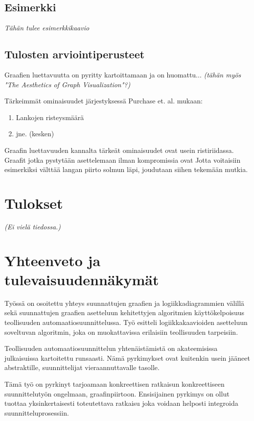 \documentclass[finnish,12pt]{article}
\begin{document}
		\subsection{Esimerkki}
			\emph{Tähän tulee esimerkkikaavio}


		\subsection{Tulosten arviointiperusteet}



Graafien luettavuutta on pyritty kartoittamaan ja on huomattu... \cite{RefWorks:47}
\emph{(tähän myös "The Aesthetics of Graph Visualization"?)}

Tärkeimmät ominaisuudet järjestyksessä Purchase et. al. mukaan: 
\begin{enumerate}
  \item Lankojen risteysmäärä
  \item jne. (kesken)
\end{enumerate}

Graafin luettavuuden kannalta tärkeät ominaisuudet ovat usein ristiriidassa.
Graafit jotka pystytään asettelemaan ilman kompromissia ovat 
Jotta voitaisiin esimerkiksi välttää langan piirto solmun läpi, joudutaan siihen tekemään mutkia.


	\clearpage
	\section{Tulokset}
	
\emph{(Ei vielä tiedossa.)}

	\section{Yhteenveto ja tulevaisuudennäkymät}

Työssä on osoitettu yhteys suunnattujen graafien ja logiikkadiagrammien välillä sekä suunnattujen graafien asetteluun kehitettyjen algoritmien käyttökelpoisuus teollisuuden automaatiosuunnittelussa.
Työ esitteli logiikkakaavioiden asetteluun soveltuvan algoritmin, joka on muokattavissa erilaisiin teollisuuden tarpeisiin.

Teollisuuden automaatiosuunnittelun yhtenäistämistä on akateemisissa julkaisuissa kartoitettu runsaasti.
Nämä pyrkimykset ovat kuitenkin usein jääneet abstraktille, suunnittelijat vieraannuttavalle tasolle.

Tämä työ on pyrkinyt tarjoamaan konkreettisen ratkaisun konkreettiseen suunnittelutyön ongelmaan, graafinpiirtoon.
Ensisijainen pyrkimys on ollut tuottaa yksinkertaisesti toteutettava ratkaisu joka voidaan helposti integroida suunnitteluprosessiin.
\end{document}
